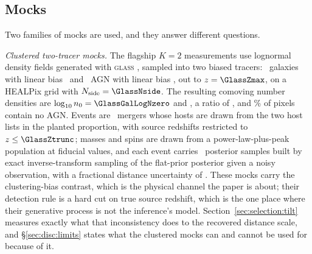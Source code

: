 \subsection{Mocks}
\label{sec:methods:mocks}

Two families of mocks are used, and they answer different questions.

\emph{Clustered two-tracer mocks.} The flagship $K=2$ measurements use
lognormal density fields generated with \textsc{glass}
\citep{Tessore2023}, sampled into two biased tracers: \GlassNgal\
galaxies with linear bias \GlassBiasGal\ and \GlassNagn\ AGN with linear bias
\GlassBiasAgn, out to $z = \GlassZmax$, on a HEALPix grid with
$N_{\rm side} = \GlassNside$. The resulting comoving number densities are
$\log_{10} n_0 = \GlassGalLogNzero$ and \GlassAgnLogNzero, a ratio of
\GlassDensityRatio, and \GlassAgnEmptyPix\% of pixels contain no AGN. Events
are \GlassNobs\ mergers whose hosts are drawn from the two host lists in the
planted proportion, with source redshifts restricted to $z \le \GlassZtrunc$;
masses and spins are drawn from a power-law-plus-peak population at fiducial
values, and each event carries \GlassNsamp\ posterior samples built by exact
inverse-transform sampling of the flat-prior posterior given a noisy
observation, with a fractional distance uncertainty of \GlassDlUnc. These mocks
carry the clustering-bias contrast, which is the physical channel the paper is
about; their detection rule is a hard cut on true source redshift, which is the
one place where their generative process is not the inference's model.
Section~\ref{sec:selection:tilt} measures exactly what that inconsistency does
to the recovered distance scale, and \S\ref{sec:disc:limits} states what the
clustered mocks can and cannot be used for because of it.

